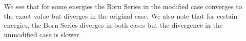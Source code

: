 \documentclass[a4paper,10pt]{report}
\begin{document}
We see that for some energies the Born Series in the modified case converges to the exact value but diverges in the original case. We also note that
for certain energies, the Born Series diverges in both cases but the divergence in the unmodified case is slower.


\end{document}

